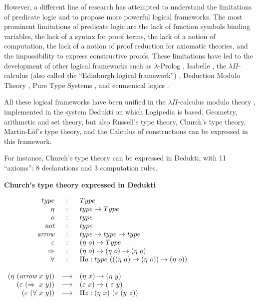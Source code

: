 However, a different line of research has attempted to understand the
limitations of predicate logic and to propose more powerful logical
frameworks.  The most prominent limitations of predicate logic are the
lack of function symbols binding variables, the lack of a syntax for
proof terms, the lack of a notion of computation, the lack of a notion
of proof reduction for axiomatic theories, and the impossibility to
express constructive proofs. These limitations have led to the
development of other logical frameworks such as $\lambda$-Prolog
\cite{MillerNadathur12}, Isabelle \cite{Paulson90},
the $\lambda \Pi$-calculus (also called the ``Edinburgh logical
framework'') \cite{HarperHonsellPlotkin91}, Deduction Modulo Theory
\cite{DowekHardinKirchner03, DowekWerner03}, Pure Type Systems
\cite{Berardi88,Terlouw89}, and ecumenical logics
\cite{Prawitz15,Dowek15,PereiraRodriguez17}.

All these logical frameworks have been unified in the $\lambda
\Pi$-calculus modulo theory \cite{CousineauDowek07}, implemented in
the system Dedukti \cite{Assaf16} on which Logipedia is
based. Geometry, arithmetic and set theory, but also Russell's type
theory, Church's type theory, Martin-L\"of's type theory, and the
Calculus of constructions can be expressed in this framework.

For instance, Church's type
theory can be expressed in Dedukti, with 11 ``axioms'': 8 declarations
and 3 computation rules.

\begin{shaded}
\vspace{-0.5cm}
\begin{center}
{\bf \Large Church's type theory expressed in Dedukti}
\end{center}

$\begin{array}{rcl}
type&:&Type\\
\eta&:&type \rightarrow Type\\
o&:&type\\
\mbox{\it nat}&:&type\\
\mbox{\it arrow}&:&type \rightarrow type \rightarrow type\\
\varepsilon&:&(\eta~o) \rightarrow Type\\
\Rightarrow&:&(\eta~o) \rightarrow (\eta~o) \rightarrow (\eta~o)\\
\forall&:&\Pi a:type~(((\eta~a) \rightarrow (\eta~o)) \rightarrow (\eta~o))\\
\\
(\eta~(\mbox{\it arrow}~x~y)) &\longrightarrow& (\eta~x) \rightarrow (\eta~y)\\
(\varepsilon~(\Rightarrow~x~y)) &\longrightarrow& (\varepsilon~x) \rightarrow (\
\varepsilon~y)\\
(\varepsilon~(\forall~x~y)) &\longrightarrow& \Pi z:(\eta~x)~(\varepsilon~(y~z))
\end{array}$
\end{shaded}


